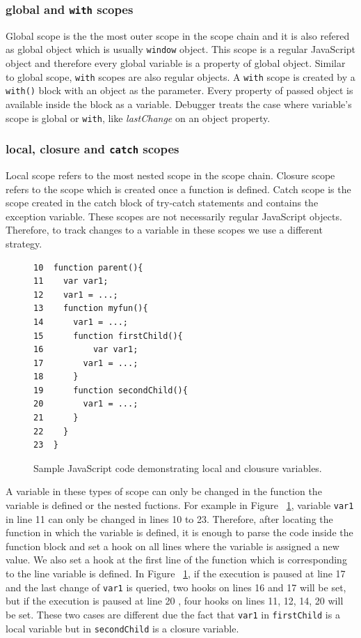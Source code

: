 \documentclass[preprint]{sigplanconf}
\begin{document}
\subsubsection{global and \texttt{with} scopes}
Global scope is the the most outer scope in the scope chain and it is also refered as global object which is usually \texttt{window} object. This scope is a regular JavaScript object and therefore every global variable is a property of global object. Similar to global scope, \texttt{with} scopes are also regular objects. A \texttt{with} scope is created by a \texttt{with()} block with an object as the parameter. Every property of passed object is available inside the block as a variable. Debugger treats the case where variable's scope is global or \texttt{with}, like \textit{lastChange} on an object property. 

\subsubsection{local, closure and \texttt{catch} scopes}
Local scope refers to the most nested scope in the scope chain. Closure scope refers to the scope which is created once a function is defined. Catch scope is the scope created in the catch block of try-catch statements and contains the exception variable. These scopes are not necessarily regular JavaScript objects. Therefore, to track changes to a variable in these scopes we use a different strategy. 

\begin{figure}[htp]
\begin{verbatim}
10  function parent(){
11    var var1;
12    var1 = ...;
13    function myfun(){
14      var1 = ...;
15      function firstChild(){
16       	var var1;
17        var1 = ...;
18      }  
19      function secondChild(){
20        var1 = ...;			      
21      }
22    }  
23  }    
\end{verbatim}
\caption{Sample JavaScript code demonstrating local and clousure variables.}
\label{fig:js-closure}
\end{figure}

A variable in these types of scope can only be changed in the function the variable is defined or the nested fuctions. For example in Figure ~\ref{fig:js-closure}, variable \texttt{var1} in line 11 can only be changed in lines 10 to 23. Therefore, after locating the function in which the variable is defined, it is enough to parse the code inside the function block and set a hook on all lines where the variable is assigned a new value.%
We also set a hook at the first line of the function which is corresponding to the line variable is defined. In Figure ~\ref{fig:js-closure}, if the execution is paused at line 17 and the last change of \texttt{var1} is queried, two hooks on lines 16 and 17 will be set, but if the execution is paused at line 20 , four hooks on lines 11, 12, 14, 20 will be set. These two cases are different due the fact that \texttt{var1} in \texttt{firstChild} is a local variable but in \texttt{secondChild} is a closure variable.
\end{document}

